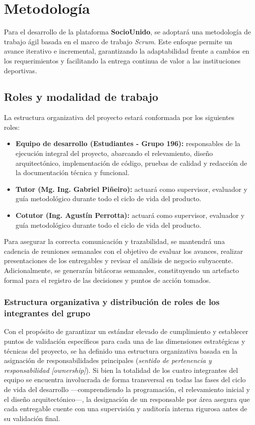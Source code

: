 \section{Metodología}

Para el desarrollo de la plataforma \textbf{SocioUnido}, se adoptará una metodología de trabajo ágil basada en el marco de trabajo \textit{Scrum}. Este enfoque permite un avance iterativo e incremental, garantizando la adaptabilidad frente a cambios en los requerimientos y facilitando la entrega continua de valor a las instituciones deportivas.

\subsection{Roles y modalidad de trabajo}

La estructura organizativa del proyecto estará conformada por los siguientes roles:

\begin{itemize}
    \item \textbf{Equipo de desarrollo (Estudiantes - Grupo 196):} responsables de la ejecución integral del proyecto, abarcando el relevamiento, diseño arquitectónico, implementación de código, pruebas de calidad y redacción de la documentación técnica y funcional.
    \item \textbf{Tutor (Mg. Ing. Gabriel Piñeiro):} actuará como supervisor, evaluador y guía metodológico durante todo el ciclo de vida del producto.
    \item \textbf{Cotutor (Ing. Agustín Perrotta):} actuará como supervisor, evaluador y guía metodológico durante todo el ciclo de vida del producto.
\end{itemize}

Para asegurar la correcta comunicación y trazabilidad, se mantendrá una cadencia de reuniones semanales con el objetivo de evaluar los avances, realizar presentaciones de los entregables y revisar el análisis de negocio subyacente. Adicionalmente, se generarán bitácoras semanales, constituyendo un artefacto formal para el registro de las decisiones y puntos de acción tomados.

\subsubsection*{Estructura organizativa y distribución de roles de los integrantes del grupo}

Con el propósito de garantizar un estándar elevado de cumplimiento y establecer puntos de validación específicos para cada una de las dimensiones estratégicas y técnicas del proyecto, se ha definido una estructura organizativa basada en la asignación de responsabilidades principales (\textit{sentido de pertenencia y responsabilidad [ownership]}). Si bien la totalidad de los cuatro integrantes del equipo se encuentra involucrada de forma transversal en todas las fases del ciclo de vida del desarrollo —comprendiendo la programación, el relevamiento inicial y el diseño arquitectónico—, la designación de un responsable por área asegura que cada entregable cuente con una supervisión y auditoría interna rigurosa antes de su validación final.

